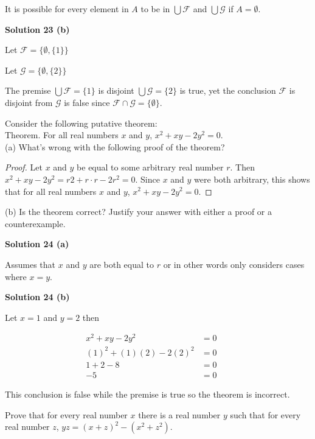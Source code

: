 It is possible for every element in $A$ to be in $\bigcup \mathcal{F}$ and
$\bigcup \mathcal{G}$ if $A = \emptyset$.

\textbf{Solution 23 (b)}

Let $\mathcal{F} = \{\emptyset, \{1\}\}$

Let $\mathcal{G} = \{\emptyset, \{2\}\}$

The premise $\bigcup \mathcal{F} = \{1\}$ is disjoint $\bigcup \mathcal{G} =
    \{2\}$ is true, yet the conclusion $\mathcal{F}$ is disjoint from $\mathcal{G}$
is false since $\mathcal{F} \cap \mathcal{G} = \{\emptyset\}$.

\begin{tcolorbox}[title=Problem 24, breakable]
    Consider the following putative theorem: \\
    Theorem. For all real numbers $x$ and $y$, $x^2 + xy -
        2y^2 = 0$. \\
    (a) What’s wrong with the following proof of the
    theorem?
    \begin{proof}
        Let $x$ and $y$ be equal to some arbitrary real
        number $r$. Then
        $x^2 + xy - 2y^2 = r2 + r \cdot r - 2r^2 = 0$.
        Since $x$ and $y$ were both arbitrary, this shows that
        for all real numbers $x$ and $y$, $x^2 + xy - 2y^2 = 0$.
    \end{proof}
    (b) Is the theorem correct? Justify your answer with
    either a proof or a counterexample.
\end{tcolorbox}

\textbf{Solution 24 (a)}

Assumes that $x$ and $y$ are both equal to $r$ or in other words only considers
cases where $x = y$.

\textbf{Solution 24 (b)}

Let $x = 1$ and $y = 2$ then 

\begin{align*}
    x^2 + xy - 2y^2             & = 0  &  & \\
    {(1)}^2 + (1)(2) - 2{(2)}^2 & = 0  &  & \\
    1 + 2 - 8                   & = 0  &  & \\
    -5                          & = 0
\end{align*}

This conclusion is false while the premise is true so the theorem is incorrect.

\begin{tcolorbox}[title=Problem 25, breakable]
    Prove that for every real number $x$ there is a real
    number $y$ such that for every real number $z$, $yz = {(x
        + z)}^2 - (x^2 + z^2)$.
\end{tcolorbox}

